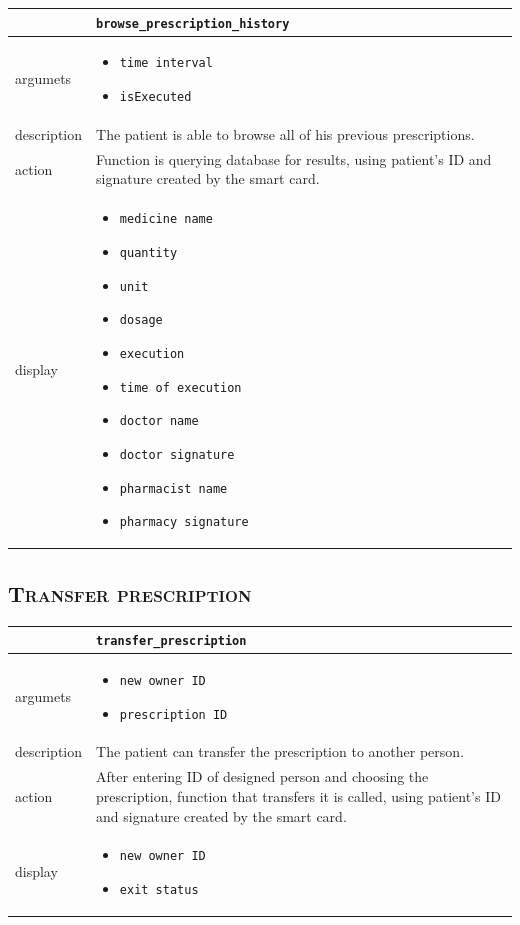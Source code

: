 \documentclass[12pt,titlepage]{article}
\begin{document}
\begin{tabularx}{\textwidth}{ |p{2.5cm}|X| }
	\hline
	 &  \texttt{browse\_prescription\_history}\\
\hline	
argumets & 
\begin{itemize}
\item \texttt{time interval}
\item \texttt{isExecuted}
\end{itemize} \\
\hline
description & The patient is able to browse all of his previous prescriptions.\\
\hline
action & Function is querying database for results, using patient's ID and signature created by the smart card.\\
\hline
display &
\begin{itemize}
\item \texttt{medicine name}
\item \texttt{quantity}
\item \texttt{unit}
\item \texttt{dosage}
\item \texttt{execution}
\item \texttt{time of execution}
\item \texttt{doctor name}
\item \texttt{doctor signature}
\item \texttt{pharmacist name}
\item \texttt{pharmacy signature}
\end{itemize}\\
\hline
\end{tabularx}

\subsection{\textsc{Transfer prescription}}

\begin{tabularx}{\textwidth}{ |p{2.5cm}|X| }
	\hline
	 &  \texttt{transfer\_prescription}\\
\hline	
argumets & 
\begin{itemize}
\item \texttt{new owner ID}
\item \texttt{prescription ID}
\end{itemize} \\
\hline
description & The patient can transfer the prescription to another person.\\
\hline
action & After entering ID of designed person and choosing the prescription, function that transfers it is called, using patient's ID and signature created by the smart card.\\
\hline
display &
\begin{itemize}
\item \texttt{new owner ID}
\item \texttt{exit status}
\end{itemize}\\
\hline
\end{tabularx}
\end{document}
